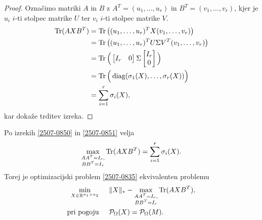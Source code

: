 \begin{proof}
    Označimo matriki $A$ in $B$ z
    $A^T = (u_1, \hdots , u_r)$ in $B^T = (v_1, \hdots , v_r)$,
    kjer je $u_i$ $i$-ti stolpec matrike $U$ ter $v_i$ $i$-ti stolpec
    matrike $V$.
    \begin{align*}
        \operatorname{Tr}(AXB^T) & = \operatorname{Tr}\big((u_1, \hdots , u_r)^T X (v_1, \hdots , v_r)\big)                                                                                                      \\
                   & = \operatorname{Tr}\big((u_1, \hdots , u_r)^T U \Sigma V^T (v_1, \hdots , v_r)\big)                                                                                           \\
                   & =\operatorname{Tr}\Big( \begin{bmatrix} I_r & 0 \end{bmatrix} \Sigma \begin{bmatrix} I_r  \\ 0  \end{bmatrix}\Big)                                               \\
                   & = \operatorname{Tr}\Big(
                   \operatorname{diag}(\sigma_1(X),\ldots,\sigma_r(X))
                    \Big) \\
                   & = \sum_{i = 1}^{r} \sigma_i(X),
    \end{align*}
    kar dokaže trditev izreka.
\end{proof}
Po izrekih \ref{2507-0850} in \ref{2507-0851}
velja
\[
    \max_{
        \substack{AA^T = I_r,\\ BB^T = I_r}} \operatorname{Tr}(AXB^T) = \sum^{r}_{i = 1} \sigma_i(X).
\]
Torej je optimizacijski problem
\eqref{2507-0835} ekvivalenten
problemu
\begin{align*}
    \min_{X\in  \mathbb{R}^{n_1 \times n_2}}\hspace{0.5cm} & \lVert X\rVert_* - \max_{\substack{AA^T = I_r, \\ BB^T = I_r}} \operatorname{Tr}(AXB^T), \\
    \text{pri pogoju} \hspace{0.5cm}                       & \mathcal{P}_\Omega(X) = \mathcal{P}_\Omega(M).
\end{align*}

